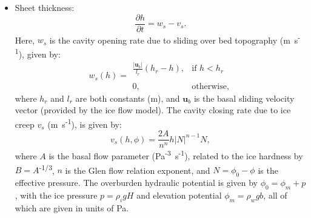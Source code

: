 \begin{itemize}
	\item Sheet thickness:
	\begin{equation}
		\frac{\partial h}{\partial t} = w_s - v_s.
	\end{equation}
	Here, $w_s$ is the cavity opening rate due to sliding over bed topography (m~s\textsuperscript{-1}), given by:
	\begin{equation}
		w_s\left(h\right) =
		\begin{array}{ll}
			\displaystyle \frac{\left|\boldsymbol{u}_b\right|}{l_r}\left(h_r-h\right), & \text{if } h<h_r\\
			\\
			0, & \text{otherwise,}
		\end{array}
	\end{equation}
	where $h_r$ and $l_r$ are both constants (m), and $\boldsymbol{u}_b$ is the basal sliding velocity vector (provided by the ice flow model). The cavity closing rate due to ice creep $v_s$ (m~s\textsuperscript{-1}), is given by:
	\begin{equation}
		v_s\left(h,\phi\right) = \frac{2A}{n^n}h\left|N\right|^{n-1}N,
	\end{equation}
	where $A$ is the basal flow parameter (Pa\textsuperscript{-3}~s\textsuperscript{-1}), related to the ice hardness by $B=A$\textsuperscript{-1/3}, $n$ is the Glen flow relation exponent, and $N= \phi_0-\phi$ is the effective pressure. The overburden hydraulic potential is given by $\phi_0 = \phi_m+p$, with the ice pressure $p = \rho_i g H$ and elevation potential $\phi_m = \rho_w g b$, all of which are given in units of Pa.
\end{itemize}

